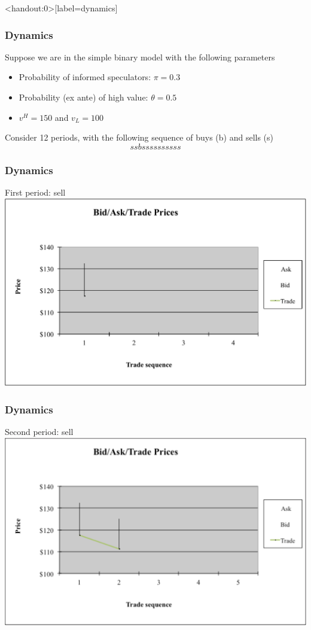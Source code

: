 \documentclass[english,10pt]{beamer}
\begin{document}
\begin{frame}<handout:0>[label=dynamics]
	\frametitle{Dynamics}
	Suppose we are in the simple binary model with the following parameters
	\begin{itemize}
		\item Probability of informed speculators: $\pi = 0.3$
		\item Probability (ex ante) of high value: $\theta = 0.5$
		\item $v^H=150$ and $v_L=100$
	\end{itemize}
	Consider 12 periods, with the following sequence of buys (b) and sells (s)
	\[
	ssbssssssssss
	\]
\end{frame}


\begin{frame}
	\frametitle{Dynamics}
	First period: sell
	\center
	\includegraphics[width=0.9\linewidth]{pics/P1_Image.pdf}
\end{frame}


\begin{frame} [noframenumbering]
	\frametitle{Dynamics}
	Second period: sell
	\center
	\includegraphics[width=0.9\linewidth]{pics/P2_Image.pdf}
\end{frame}
\end{document}

